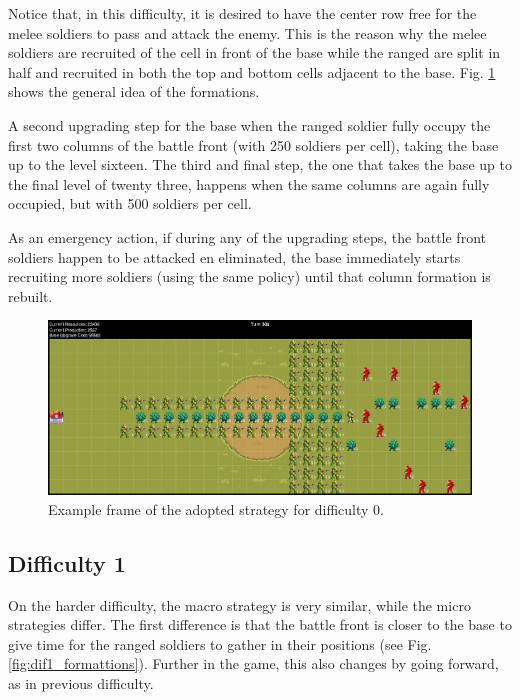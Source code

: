 \documentclass[conference]{IEEEtran}
\begin{document}
Notice that, in this difficulty, it is desired to have the center row free for the melee soldiers to pass and attack the enemy. This is the reason why the melee soldiers are recruited of the cell in front of the base while the ranged are split in half and recruited in both the top and bottom cells adjacent to the base. Fig. \ref{fig:dif0_formattions} shows the general idea of the formations.

A second upgrading step for the base when the ranged soldier fully occupy the first two columns of the battle front (with 250 soldiers per cell), taking the base up to the level sixteen. The third and final step, the one that takes the base up to the final level of twenty three, happens when the same columns are again fully occupied, but with 500 soldiers per cell.

As an emergency action, if during any of the upgrading steps, the battle front soldiers happen to be attacked en eliminated, the base immediately starts recruiting more soldiers (using the same policy) until that column formation is rebuilt. 

\begin{figure}[htbp]
    \centering
    \includegraphics[width=\textwidth]{imgs/dif0_formattions.png}
    \caption{Example frame of the adopted strategy for difficulty 0.}
    \label{fig:dif0_formattions}
\end{figure}

\subsection{Difficulty 1}

On the harder difficulty, the macro strategy is very similar, while the micro strategies differ. The first difference is that the battle front is closer to the base to give time for the ranged soldiers to gather in their positions (see Fig. \ref{fig:dif1_formattions}). Further in the game, this also changes by going forward, as in previous difficulty.
\end{document}
